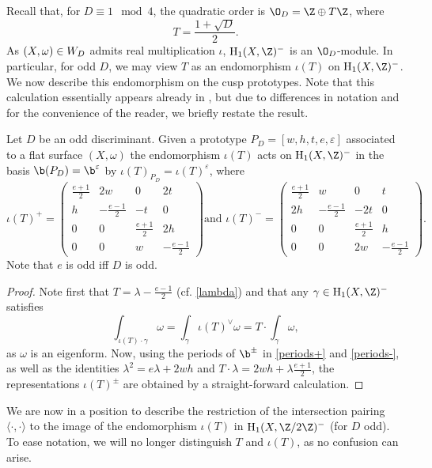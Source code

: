 \documentclass{amsart}
\renewcommand{\H}%
{\mathrm{H}}
\def\ep{\varepsilon}
\begin{document}
Recall that, for $D\equiv 1\mod 4$, the quadratic order is $\O_D=\Z\oplus T\Z$, where
\[T=\frac{1+\sqrt{D}}{2}.\]
As $(X,\omega)\in\W$ admits real multiplication $\iota$, $\H_1(X,\Z)^-$ is an $\O_D$-module. In particular, for odd $D$, we may view $T$ as an endomorphism $\iota(T)$ on $\H_1(X,\Z)^-$.
We now describe this endomorphism on the cusp prototypes. Note that this calculation essentially appears already in \cite[\S 4]{lanneaunguyen}, but due to differences in notation and for the convenience of the reader, we briefly restate the result.
\begin{lemma}
Let $D$ be an odd discriminant.
Given a prototype $P_D=[w,h,t,e,\ep]$ associated to a flat surface $(X,\omega)$ the endomorphism $\iota(T)$ acts on $\H_1(X,\Z)^-$ in the basis $\b(P_D)=\b^\ep$ by $\iota(T)_{P_D}=\iota(T)^\ep$, where
\begin{equation*}%
\iota(T)^+=\begin{pmatrix}\frac{e+1}{2}&2w&0&2t\\h&-\frac{e-1}{2}&-t&0\\0&0&\frac{e+1}{2}&2h\\0&0&w&-\frac{e-1}{2}\end{pmatrix}
\text{and }
\iota(T)^-=\begin{pmatrix}\frac{e+1}{2}&w&0&t\\2h&-\frac{e-1}{2}&-2t&0\\0&0&\frac{e+1}{2}&h\\0&0&2w&-\frac{e-1}{2}\end{pmatrix}.
\end{equation*}
Note that $e$ is odd iff $D$ is odd.
\end{lemma}

\begin{proof}
Note first that $T=\lambda-\frac{e-1}{2}$ (cf. \eqref{lambda}) and that any $\gamma\in\H_1(X,\Z)^-$ satisfies
\[\int_{\iota(T)\cdot\gamma}\omega=\int_\gamma\iota(T)^\vee\omega=T\cdot\int_{\gamma}\omega,\]
as $\omega$ is an eigenform.
Now, using the periods of $\b^\pm$ in \eqref{periods+} and \eqref{periods-}, as well as the identities $\lambda^2=e\lambda+2wh$ and $T\cdot\lambda=2wh+\lambda\frac{e+1}{2}$, the representations $\iota(T)^\pm$ are obtained by a straight-forward calculation.
\end{proof}

We are now in a position to describe the restriction of the intersection pairing $\langle\cdot,\cdot\rangle$ to the image of the endomorphism $\iota(T)$ in $\H_1(X,\Z/2\Z)^-$ (for $D$ odd). To ease notation, we will no longer distinguish $T$ and $\iota(T)$, as no confusion can arise.
\end{document}
